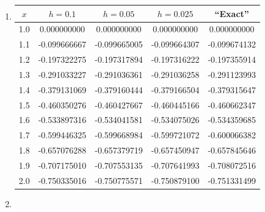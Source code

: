 \documentclass[openany]{book}
\newenvironment{sectionSolutions}{
 \begin{enumerate}[item-label={\thesection.\arabic{enumi}.}]
}{
 \end{enumerate}
}
\begin{document}
\begin{sectionSolutions}
\item
{\small
{}
\begin{tabular}{S[table-format=1.1] *4{S[table-format=1.9]} }\toprule
{$x$}&{$h=0.1$}&{$h=0.05$}&{$h=0.025$}&{``Exact''}\\  & 0.000000000 & 0.000000000  &  0.000000000 &  0.000000000 \\
1.1 &-0.099666667 &-0.099665005  & -0.099664307 & -0.099674132 \\
1.2 &-0.197322275 &-0.197317894  & -0.197316222 & -0.197355914 \\
1.3 &-0.291033227 &-0.291036361  & -0.291036258 & -0.291123993 \\
1.4 &-0.379131069 &-0.379160444  & -0.379166504 & -0.379315647 \\
1.5 &-0.460350276 &-0.460427667  & -0.460445166 & -0.460662347 \\
1.6 &-0.533897316 &-0.534041581  & -0.534075026 & -0.534359685 \\
1.7 &-0.599446325 &-0.599668984  & -0.599721072 & -0.600066382 \\
1.8 &-0.657076288 &-0.657379719  & -0.657450947 & -0.657845646 \\
1.9 &-0.707175010 &-0.707553135  & -0.707641993 & -0.708072516 \\
2.0 &-0.750335016 &-0.750775571  & -0.750879100 & -0.751331499 \\
\bottomrule
\end{tabular}}\bigskip

\item
{}
\end{sectionSolutions}
\end{document}
